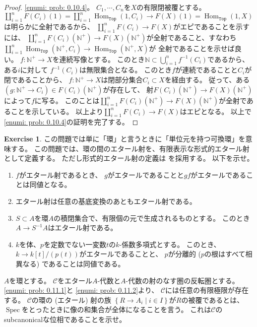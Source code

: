 \documentclass[uplatex]{jsarticle}
\theoremstyle{definition}
\newtheorem{prob}[prob]{Exercise}
\DeclareMathOperator{\Hom}{Hom}
\DeclareMathOperator{\Spec}{\mathrm{Spec}}
\def\N{\mathbb{N}}
\def\mcC{\mathcal{C}}
\DeclareMathOperator{\sfTop}{\mathtt{Top}}
\begin{document}
\begin{proof}
  \ref{enumi: prob: 0.10.4}。
  \(C_1,\cdots,C_n\)を\(X\)の有限閉被覆とする。
  \(\coprod_{i=1}^n F(C_i)(1) = \coprod_{i=1}^n \Hom_{\sfTop}(1,C_i)
  \to F(X)(1) = \Hom_{\sfTop}(1,X)\)は明らかに全射であるから、
  \(\coprod_{i=1}^n F(C_i) \to F(X)\)がエピであることを示すには、
  \(\coprod_{i=1}^n F(C_i)(\N^+) \to F(X)(\N^+)\)が全射であること、すなわち
  \(\coprod_{i=1}^n\Hom_{\sfTop}(\N^+,C_i) \to \Hom_{\sfTop}(\N^+,X)\)が
  全射であることを示せば良い。
  \(f:\N^+\to X\)を連続写像とする。
  このとき\(\N\subset \bigcup_{i=1}^n f^{-1}(C_i)\)であるから、
  ある\(i\)に対して
  \(f^{-1}(C_i)\)は無限集合となる。
  このとき\(f\)が連続であることと\(C_i\)が閉であることから、
  \(f:\N^+\to X\)は閉部分集合\(C_i\subset X\)を経由する。
  従って、ある\((g:\N^+\to C_i) \in F(C_i)(\N^+)\)が存在して、
  射\(F(C_i)(\N^+) \to F(X)(\N^+)\)によって\(f\)に写る。
  このことは\(\coprod_{i=1}^n F(C_i)(\N^+) \to F(X)(\N^+)\)が全射であることを示している。
  以上より\(\coprod_{i=1}^n F(C_i) \to F(X)\)はエピとなる。
  以上で\ref{enumi: prob: 0.10.4}の証明を完了する。
\end{proof}




\begin{prob}\label{prob: 0.11}
  この問題では単に「環」と言うときに「単位元を持つ可換環」を意味する。
  この問題では、環の間のエタール射を、有限表示な形式的エタール射として定義する。
  ただし形式的エタール射の定義は
  \cite[\href{https://stacks.math.columbia.edu/tag/00UQ}{Tag 00UQ}]{stacks-project}
  を採用する。
  以下を示せ。
  \begin{enumerate}
    \item \label{enumi: prob: 0.11.1}
    \(f\)がエタール射であるとき、
    \(g\)がエタールであることと\(gf\)がエタールであることは同値となる。
    \item \label{enumi: prob: 0.11.2}
    エタール射は任意の基底変換のあともエタール射である。
    \item \label{enumi: prob: 0.11.3}
    \(S\subset A\)を環\(A\)の積閉集合で、有限個の元で生成されるものとする。
    このとき\(A\to S^{-1}A\)はエタール射である。
    \item \label{enumi: prob: 0.11.4}
    \(k\)を体、\(p\)を定数でない一変数\(t\)の\(k\)-係数多項式とする。
    このとき、\(k\to k[t]/(p(t))\)がエタールであることと、
    \(p\)が分離的 (\(p\)の根はすべて相異なる) であることは同値である。
  \end{enumerate}
  \(A\)を環とする。
  \(\mcC\)をエタール\(A\)-代数と\(A\)-代数の射のなす圏の反転圏とする。
  \ref{enumi: prob: 0.11.1}と
  \ref{enumi: prob: 0.11.2}より、
  \(\mcC\)には任意の有限極限が存在する。
  \(\mcC\)の環の (エタール) 射の族
  \(\left\{R\to A_i \middle| i\in I\right\}\)が\(R\)の被覆であるとは、
  \(\Spec\)をとったときに像の和集合が全体になることを言う。
  これは\(\mcC\)のsubcanonicalな位相であることを示せ。
\end{prob}
\end{document}
